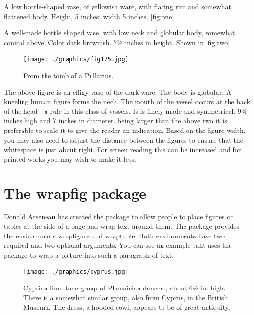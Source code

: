  A low bottle-shaped vase, of yellowish ware, with flaring rim and somewhat flattened body. Height, 5 inches; width 5 inches. \ref{fig:one}

A well-made bottle shaped vase, with low neck and globular body, somewhat conical above. Color dark brownish. 7½ inches in height. Shown in \ref{fig:two}


\begin{figure}
  \centering
  \texttt{[image: ./graphics/fig175.jpg]}
   \centerline{From the tomb of a Pull\= arius.}
  \label{fig:marginfig1}
\end{figure}

The above figure is an effigy vase of the dark ware. The body is globular. A kneeling human figure forms the neck. The mouth of the vessel occurs at the back of the head—a rule in this class of vessels. Is is finely made and symmetrical. 9¾ inches high and 7 inches in diameter. being larger than the above two it is preferable to scale it to give the reader an indication. Based on the figure width, you may also need to adjust the distance between the figures to ensure that the whitespace is just about right. For screen reading this can be increased and for printed works you may wish to make it less.







\section{The wrapfig package}


\captionsetup[wrapfigure]{margin=10pt,font=small,labelfont=bf, name=Fig.} %


Donald Arseneau has created the  package to allow people to place figures or
tables at the side of a page and wrap text around them. The package provides the
environments wrapfigure and wraptable. Both environments have two required and
two optional arguments. You can see an example taht uses the package to wrap a picture into such a paragraph of text.

\begin{figure}[82pt]
   \texttt{[image: ./graphics/cyprus.jpg]} 
   \caption{\small Cyprian limestone group of Phoenician dancers, about 6½ in. high. There is a somewhat similar group, also from Cyprus, in the British Museum. The dress, a hooded cowl, appears to be of great antiquity.}
\end{figure}

